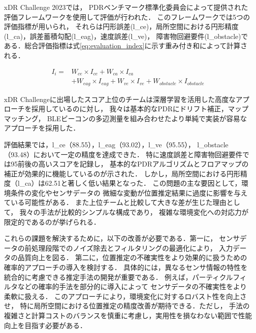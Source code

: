 xDR Challenge 2023では，
PDRベンチマーク標準化委員会によって提供された評価フレームワークを使用して評価が行われた．
このフレームワークでは5つの評価指標が用いられ，
それらは円形誤差(l\_ce)，局所空間における円形精度(l\_ca)，誤差蓄積勾配(l\_eag)，速度誤差(l\_ve)，
障害物回避要件(l\_obstacle)である．総合評価指標は式\ref{eq:evaluation_index}に示す重み付き和によって計算される．

\begin{equation}
	\begin{aligned}
		I_i = & W_{ce} \times I_{ce} + W_{ca} \times I_{ca}                                        \\
		      & + W_{eag} \times I_{eag} + W_{ve} \times I_{ve} + W_{obstacle} \times I_{obstacle}
	\end{aligned}
	\label{eq:evaluation_index}
\end{equation}

xDR Challengeに出場したスコア上位のチームは深層学習を活用した高度なアプローチを採用しているのに対し，
我々は基本的なPDRにドリフト補正，マップマッチング，
BLEビーコンの多辺測量を組み合わせたより単純で実装が容易なアプローチを採用した．

評価結果では，l\_ce（88.55），l\_eag（93.02），l\_ve（95.55），
l\_obstacle（93.48）において一定の精度を達成できた．
特に速度誤差と障害物回避要件では95前後の高いスコアを記録し，
基本的なPDRアルゴリズムとフロアマップの補正が効果的に機能しているのが示された．
しかし，局所空間における円形精度（l\_ca）は62.51と著しく低い結果となった．
この問題の主な要因として，環境条件の変化やセンサデータの
微細な変動が位置推定結果に過度に影響を与えている可能性がある．
また上位チームと比較して大きな差が生じた理由として，
我々の手法が比較的シンプルな構成であり，
複雑な環境変化への対応力が限定的であるのが挙げられる．

これらの課題を解決するために，以下の改善が必要である．第一に，
センサデータの前処理段階でのノイズ除去とフィルタリングの最適化により，
入力データの品質向上を図る．
第二に，位置推定の不確実性をより効果的に扱うための確率的アプローチの導入を検討する．
具体的には，異なるセンサ情報の特性を統合的に考慮できる推定手法の開発が重要である．
例えば，パーティクルフィルタなどの確率的手法を部分的に導入によって
センサデータの不確実性をより柔軟に扱える．
このアプローチにより，環境変化に対するロバスト性を向上させ，
特に局所空間における位置推定の精度改善が期待できる．ただし，
手法の複雑さと計算コストのバランスを慎重に考慮し，実用性を損なわない範囲で性能向上を目指す必要がある．

